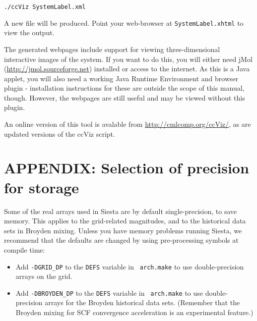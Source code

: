 \documentclass[11pt]{article}
\begin{document}
\texttt{./ccViz SystemLabel.xml}

A new file will be produced. Point your web-browser at \texttt{SystemLabel.xhtml}
to view the output.

The generated webpages include support for viewing three-dimensional
interactive images of the system. If you want to do this, you will
either need jMol (\url{http://jmol.sourceforge.net}) installed or access
to the internet. As this
is a Java applet, you will also need a working Java Runtime
Environment and browser plugin - installation instructions for these
are outside the scope of this manual, though. However, the webpages
are still useful and may be viewed without this plugin.

An online version of this tool is avalable from
\url{http://cmlcomp.org/ccViz/}, as are updated versions of
the ccViz script.

\newpage
\section{APPENDIX: Selection of precision for storage}

Some of the real arrays used in Siesta are by default
single-precision, to save memory. This applies to the grid-related
magnitudes, and to the historical data sets in Broyden mixing. 
Unless you have memory problems running Siesta, we recommend that 
the defaults are changed by using pre-processing symbols at compile
time:

\begin{itemize}
\item Add {\tt -DGRID\_DP} to the {\tt DEFS} variable in {\tt
  arch.make} to use double-precision arrays on the grid.
\item Add {\tt -DBROYDEN\_DP} to the {\tt DEFS} variable in {\tt
  arch.make} to use double-precision arrays for the Broyden historical
  data sets. (Remember that the Broyden mixing for SCF convergence
  acceleration is an experimental feature.)
\end{itemize}

\printindex
\end{document}
